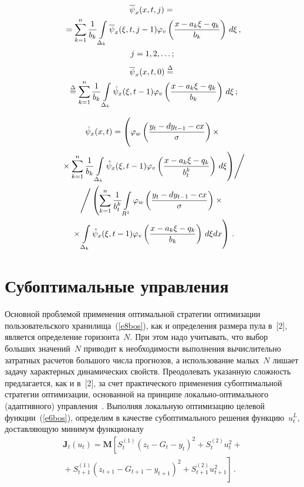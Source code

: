\begin{multicols}{2}
\noindent
\begin{multline*}
\overline{\psi}_x(x,t,j) ={}\\
{}=\sum\limits_{k=1}^n \displaystyle\frac{\displaystyle 1\mathstrut}{\displaystyle b_k\mathstrut} \int\limits_{\Delta_k} 
\overline{\psi}_x (\xi, t, j-1)\varphi_v\left( \displaystyle\frac{\displaystyle x-a_k\xi -q_k\mathstrut}{\displaystyle b_k\mathstrut}\right)\,d\xi\,,\\
j=1,2,\ldots;
\end{multline*}
\begin{multline*}
\overline{\psi}_x(x,t,0)\overset{\Delta}{=}{}\\
{}\overset{\Delta}{=} \sum\limits_{k=1}^n \displaystyle\frac{\displaystyle 1\mathstrut}{\displaystyle b_k\mathstrut}
\int\limits_{\Delta_k}\hat{\psi}_x(\xi,t-1)\varphi_v\left( \displaystyle\frac{\displaystyle x-a_k\xi-q_k\mathstrut}{\displaystyle b_k\mathstrut}\right)\,d\xi\,;
\end{multline*}

\vspace*{-12pt}

\noindent
\begin{multline*}
\hat{\psi}_x(x,t) = \left(\vphantom{\int\limits_{\Delta_k}}
\varphi_w\left(\fr{y_t-dy_{t-1}-cx}{\sigma}\right)\times\right.\\
\left.{}\times
\sum\limits_{k=1}^n 
\fr{1}{b_k}\int\limits_{\Delta_k} \hat{\psi}_x(\xi,t-1)\varphi_v
\left(\fr{x-a_k\xi-q_k}{b_t^k}\right)\,d\xi\right)\!\Bigg/\\
\Bigg/\left(\sum\limits_{k=1}^n \fr{1}{b_t^k}\int\limits_{R^1} \varphi_w \left(\fr{y_t-dy_{t-1}-
cx}{\sigma}\right)\times{}\right.\\
\left.{}\times\int\limits_{\Delta_k}\hat{\psi}_x(\xi,t-1)\varphi_v
\left(\fr{x-a_k\xi-q_k}{b_k}\right)\,d\xi dx\right)
\,.
\end{multline*}


\section{Субоптимальные управления}
  
  Основной проблемой применения оптимальной стратегии оптимизации пользовательского 
хранилища~(\ref{e8bos}), как и определения размера пула в~[2], является определение 
горизонта~$N$. При этом надо учитывать, что выбор больших значений~$N$ приводит к 
необходимости выполнения вычислительно затратных расчетов большого числа прогнозов, а 
использование малых~$N$ лишает задачу характерных динамических свойств. Преодолевать 
указанную сложность предлагается, как и в~[2], за счет практического применения 
субоптимальной стратегии оптимизации, основанной на принципе локально-оп\-ти\-маль\-но\-го 
(адаптивного) управления~\cite{7bos}. Выполняя локальную оптимизацию целевой 
функции~(\ref{e6bos}), определим в качестве субоптимального решения функцию~$u_t^L$, 
доставляющую минимум функционалу
  \begin{multline*}
  \mathbf{J}_t(u_t)=\mathbf{M}\left[ S_t^{(1)}\left( z_t-G_t-y_t\right)^2 +S_t^{(2)} u_t^2+{}\right.\\
\left.  {}+
  S_{t+1}^{(1)} \left( z_{t+1}-G_{t+1}-y_{t+1}\right)^2 +S_{t+1}^{(2)} u_{t+1}^2\right]\,.
  \end{multline*}
  

\end{multicols}
